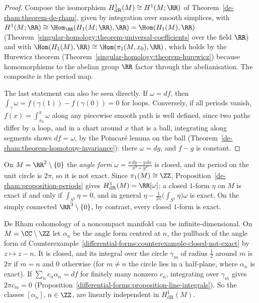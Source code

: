 \begin{proof}
Compose the isomorphism $H^1_{\mathrm{dR}}(M) \cong H^1(M; \RR)$ of Theorem~\ref{de-rham:theorem-de-rham}, given by integration over smooth simplices, with $H^1(M; \RR) \cong \Hom_\RR(H_1(M; \RR), \RR) = \Hom(H_1(M), \RR)$
(Theorem~\ref{singular-homology:theorem-universal-coefficients} over the field $\RR$) and with $\Hom(H_1(M), \RR) \cong \Hom(\pi_1(M, x_0), \RR)$, which holds by the Hurewicz theorem
(Theorem~\ref{singular-homology:theorem-hurewicz}) because homomorphisms to the abelian group $\RR$ factor through the abelianisation. The composite is the period map.

The last statement can also be seen directly. If $\omega = df$, then $\int_\gamma\omega = f(\gamma(1)) - f(\gamma(0)) = 0$ for loops. Conversely, if all periods vanish, $f(x) = \int_{x_0}^x\omega$ along any piecewise smooth path is
well defined, since two paths differ by a loop, and in a chart around $x$ that is a ball, integrating along segments shows $df = \omega$, by the Poincar\'e lemma on the ball
(Theorem~\ref{de-rham:theorem-homotopy-invariance}): there $\omega = dg$, and $f - g$ is constant.
\end{proof}

\begin{example}\label{de-rham:example-angle-form}
On $M = \RR^2 \setminus \{0\}$ the \emph{angle form} $\omega = \frac{x\,dy - y\,dx}{x^2 + y^2}$ is closed, and its period on the unit circle is $2\pi$, so it is not exact. Since $\pi_1(M) \cong \ZZ$, Proposition~\ref{de-rham:proposition-periods}
gives $H^1_{\mathrm{dR}}(M) = \RR[\omega]$: a closed $1$-form $\eta$ on $M$ is exact if and only if $\int_{S^1}\eta = 0$, and in general $\eta - \frac{1}{2\pi}\big(\int_{S^1}\eta\big)\omega$ is exact. On the simply connected
$\RR^3 \setminus \{0\}$, by contrast, every closed $1$-form is exact.
\end{example}

\begin{counterexample}\label{de-rham:counterexample-infinite-dimensional}
De Rham cohomology of a noncompact manifold can be infinite-dimensional. On $M = \CC \setminus \ZZ$ let $\alpha_n$ be the angle form centred at $n$, the pullback of the angle form of
Counterexample~\ref{differential-forms:counterexample-closed-not-exact} by $z \mapsto z - n$. It is closed, and its integral over the circle $\gamma_m$ of radius $\frac12$ around $m$ is $2\pi$ if $m = n$ and $0$ otherwise (for $m \neq n$ the circle lies in
a half-plane, where $\alpha_n$ is exact). If $\sum_nc_n\alpha_n = d f$ for finitely many nonzero $c_n$, integrating over $\gamma_m$ gives $2\pi c_m = 0$ (Proposition~\ref{differential-forms:proposition-line-integrals}). So the classes
$[\alpha_n]$, $n \in \ZZ$, are linearly independent in $H^1_{\mathrm{dR}}(M)$.
\end{counterexample}

